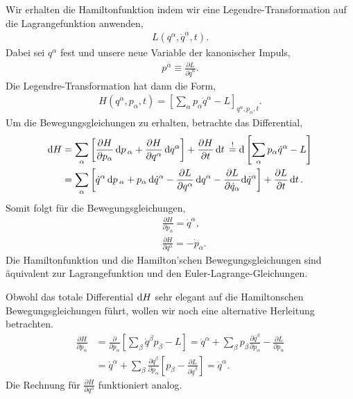 Wir erhalten die Hamiltonfunktion indem wir eine Legendre-Transformation auf
die Lagrangefunktion anwenden,
\begin{align*}
L(q^\alpha,\dot{q}^\alpha,t).
\end{align*}
Dabei sei $q^\alpha$ fest und unsere neue Variable der kanonischer Impuls,
\begin{align*}
p^\alpha \equiv \frac{\partial L}{\partial \dot{q}^\alpha}.
\end{align*}
Die Legendre-Transformation hat dann die Form,
\begin{align*}
H(q^\alpha, p_\alpha,t) = \left[\sum_\alpha p_\alpha \dot{q}^\alpha -
L\right]_{q^\alpha,p_\alpha,t}.
\end{align*}
Um die Bewegungsgleichungen zu erhalten, betrachte das Differential,
\begin{align*}
\mathrm{d} H &= \sum_\alpha\left[ \frac{\partial H}{\partial p_\alpha}\,\mathrm{d} p\,_\alpha +
\frac{\partial H}{\partial q^\alpha} \,\mathrm{d} q^\alpha\right] + \frac{\partial
H}{\partial t}\,\mathrm{d} t\, \overset{!}{=} \mathrm{d}\left[\sum_\alpha p_\alpha\dot{q}^\alpha - L 
\right]\\
&= \sum_\alpha \left[\dot{q}^\alpha\,\mathrm{d} p\,_\alpha +
p_\alpha\,\mathrm{d} \dot{q}^\alpha  - \frac{\partial L}{\partial q^\alpha}\,\mathrm{d} q^\alpha -
\frac{\partial L}{\partial \dot{q}_\alpha} \mathrm{d}\dot{q}^\alpha  \right] +
\frac{\partial L}{\partial t}\,\mathrm{d} t\,.
\end{align*}
Somit folgt für die Bewegungsgleichungen,
\begin{align*}
&\frac{\partial H}{\partial p_\alpha} = \dot{q}^\alpha,\\
&\frac{\partial H}{\partial q^\alpha} = -\dot{p}_\alpha.
\end{align*}
Die Hamiltonfunktion und die Hamilton'schen Bewegungsgleichungen sind
äquivalent zur Lagrangefunktion und den Euler-Lagrange-Gleichungen.
\begin{bemn}
Obwohl das totale Differential $\mathrm{d} H$ sehr elegant auf die Hamiltonschen
Bewegungsgleichungen führt, wollen wir noch eine alternative Herleitung
betrachten.
\begin{align*}
\frac{\partial H}{\partial p_\alpha} &= \frac{\partial}{\partial p_\alpha}\left[
\sum_\beta \dot{q}^\beta p_\beta -L \right] = \dot{q}^\alpha + \sum_\beta
p_\beta \frac{\partial\dot{q}^\beta}{\partial p_\alpha} - \frac{\partial
L}{\partial p_\alpha}
\\ &= \dot{q}^\alpha + \sum_\beta \frac{\partial \dot{q}^\beta}{\partial
p_\alpha}\left[p_\beta - \frac{\partial L}{\partial \dot{q}^\beta}\right] =
\dot{q}^\alpha.
\end{align*}
Die Rechnung für $\frac{\partial H}{\partial q^\alpha}$ funktioniert
analog.\maphere
\end{bemn}

